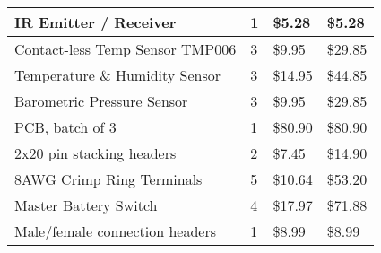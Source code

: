 \begin{longtable}[H]{| L{8.0cm} | P{1.25cm} | P{2.0cm} | P{2.0cm} |}
IR Emitter / Receiver		        & 1	    & \$5.28	&   \$5.28      \\\hline
Contact-less Temp Sensor TMP006	    & 3	    & \$9.95	&   \$29.85     \\\hline
Temperature \& Humidity Sensor 	    & 3	    & \$14.95	&   \$44.85     \\\hline
Barometric Pressure Sensor		    & 3	    & \$9.95	&   \$29.85     \\\hline
PCB, batch of 3                     & 1	    & \$80.90	&   \$80.90     \\\hline
2x20 pin stacking headers			& 2	    & \$7.45	&   \$14.90     \\\hline
8AWG Crimp Ring Terminals			& 5	    & \$10.64	&   \$53.20     \\\hline
Master Battery Switch			    & 4	    & \$17.97	&   \$71.88     \\\hline
Male/female connection headers		& 1	    & \$8.99	&   \$8.99      \\\hline


\end{longtable}

\begin{comment}

TOTAL = \$1.966.64

\end{comment}